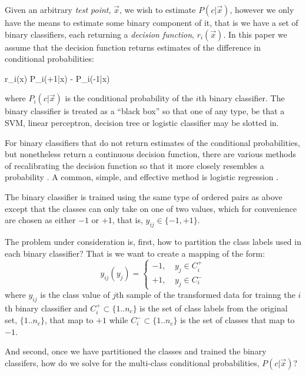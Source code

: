 Given an arbitrary {\it test point}, $\vec x$, 
we wish to estimate $P(c | \vec x)$, however we only have
the means to estimate some binary component of it, that is we have a 
set of binary classifiers, 
each returning a {\it decision function}, $r_i(\vec x)$.
In this paper we assume that the decision function 
returns estimates of the difference in conditional probabilities:
\begin{eqnnon}
	r_i(\vec x) \approx P_i(+1|\vec x) - P_i(-1|\vec x)
\end{eqnnon}
where $P_i(c|\vec x)$ is the conditional probability of the $i$th
binary classifier.
The binary classifier is treated as a ``black box'' so that one of any type,
be that a SVM, linear perceptron, decision tree or logistic classifier may be 
slotted in.

For binary classifiers that do not return estimates of the conditional
probabilities, but nonetheless return a continuous decision function,
there are various methods of recalibrating the decision function
so that it more closely resembles a probability 
\citep{Zadrozny_Elkan2002,Jolliffe_Stephenson2003,Niculescu_Caruana2005}.
A common, simple, and effective method is logistic regression \citep{Platt1999}.

The binary classifier is trained using the same type of ordered pairs as
above except that the classes can only take on one of two values,
which for convenience are chosen as either $-1$ or $+1$, 
that is, $y_{ij} \in \lbrace -1, +1 \rbrace$.

The problem under consideration is, first,
how to partition the class labels used in each binary classifier?
That is we want to create a mapping of the form:
\begin{equation}
	y_{ij} (y_j) = \left \lbrace  \begin{array}{lr}
-1, & ~ y_j \in C_i^+ \\
+1, & ~ y_j \in C_i^-
\end{array}
	\right . \label{mapping}
\end{equation}
where $y_{ij}$ is the class value of $j$th sample of the transformed data 
for trainng the $i$th binary classifier and 
$C_i^+ \subset \lbrace 1..n_c \rbrace$ is the set of class labels from the original set,
$\lbrace 1..n_c \rbrace$, that map to $+1$ while
$C_i^- \subset \lbrace 1..n_c \rbrace$ is the set of classes that map to $-1$.

And second, once we have partitioned the classes
and trained the binary classifers,
how do we solve for the multi-class conditional probabilities, $P(c|\vec x)$?

